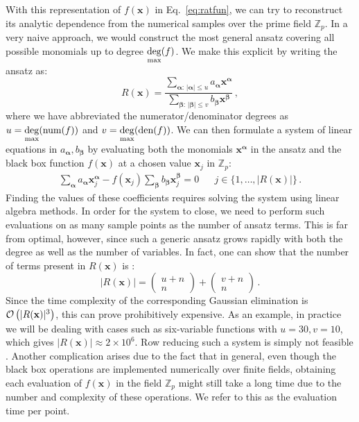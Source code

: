\documentclass[main.tex]{subfiles}
\begin{document}
With this representation of $f(\mathbf{x})$ in Eq.~\ref{eq:ratfun}, we can try to reconstruct its analytic dependence from the numerical samples over the prime field $\mathbb{Z}_p$. In a very naive approach, we would construct the most general ansatz covering all possible monomials up to degree $\underset{\text{max}}{\deg} (f)$. We make this explicit by writing the ansatz as:
\begin{equation}
    R(\mathbf{x}) = \frac{
    \sum\limits_{\bm{\alpha}:\, |\bm{\alpha}| \le u} a_{\bm{\alpha}} \mathbf{x}^{\bm{\alpha}}
    }{
    \sum\limits_{\bm{\beta}:\, |\bm{\beta}| \le v} b_{\bm{\beta}} \mathbf{x}^{\bm{\beta}}
    }\,,
\end{equation}
where we have abbreviated the numerator/denominator degrees as $u=\underset{\text{max}}{\deg}(\text{num}(f))$ and $v=\underset{\text{max}}{\deg}(\text{den}(f))$. We can then formulate a system of linear equations in $a_{\bm{\alpha}}, b_{\bm{\beta}}$ by evaluating both the monomials $\mathbf{x}^{\bm{\alpha}}$ in the ansatz and the black box function $f(\mathbf{x})$ at a chosen value $\mathbf{x}_j$ in $\mathbb{Z}_p$:
\begin{align}
    \sum_{\bm{\alpha}} a_{\bm{\alpha}} \mathbf{x}_j^{\bm{\alpha}} - 
    f(\mathbf{x}_j) \sum_{\bm{\beta}} b_{\bm{\beta}} \mathbf{x}_j^{\bm{\beta}} = 0 
&&    
j \in \{1, \ldots, |R(\mathbf{x})|\} \,.
\end{align}
Finding the values of these coefficients requires solving the system using linear algebra methods. In order for the system to close, we need to perform such evaluations on as many sample points as the number of ansatz terms. This is far from optimal, however, since such a generic ansatz grows rapidly with both the degree as well as the number of variables. In fact, one can show that the number of terms present in $R(\mathbf{x})$ is :
\begin{equation} \label{eq:naiveansatzlength}
    |R(\mathbf{x})| = 
    \begin{pmatrix}
        u + n \\
        n
    \end{pmatrix}
    +
    \begin{pmatrix}
        v + n \\
        n
    \end{pmatrix}\,.
\end{equation}
Since the time complexity of the corresponding Gaussian elimination is $\mathcal{O}\left(|R(\mathbf{x})|^3\right)$, this can prove prohibitively expensive. As an example, in practice we will be dealing with cases such as six-variable functions with $u=30, v=10$, which gives $|R(\mathbf{x})| \approx 2\times 10^6$. Row reducing such a system is simply not feasible . Another complication arises due to the fact that in general, even though the black box operations are implemented numerically over finite fields, obtaining each evaluation of $f(\mathbf{x})$ in the field $\mathbb{Z}_p$ might still take a long time due to the number and complexity of these operations. We refer to this as the evaluation time per point.
\end{document}
